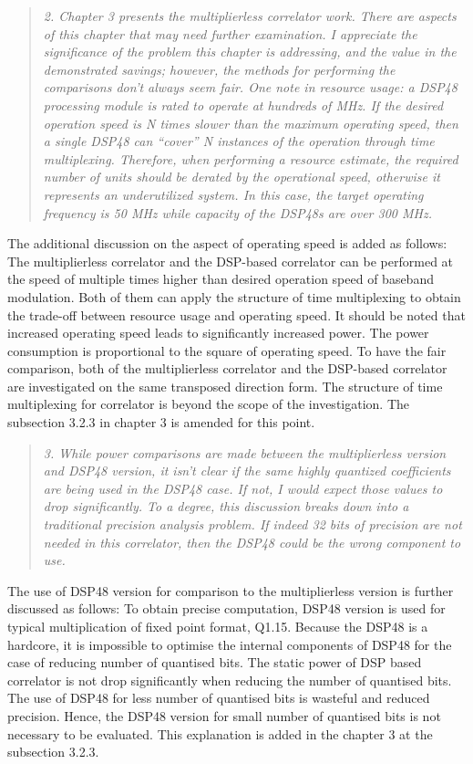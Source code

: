\documentclass{article}
\begin{document}
\begin{quote}
\emph{2. Chapter 3 presents the multiplierless correlator work. There are aspects of this chapter that may need further examination. I appreciate the significance of the problem this chapter is addressing, and the value in the demonstrated savings; however, the methods for performing the comparisons don’t always seem fair.
One note in resource usage: a DSP48 processing module is rated to operate at hundreds of MHz. If the desired operation speed is N times slower than the maximum operating speed, then a single DSP48 can “cover” N instances of the operation through time multiplexing. Therefore, when performing a resource estimate, the required number of units should be derated by the operational speed, otherwise it represents an underutilized system. In this case, the target operating frequency is 50 MHz while capacity of the DSP48s are over 300 MHz.	}
\end{quote}
The additional discussion on the aspect of operating speed is added as follows:  
The multiplierless correlator and the DSP-based correlator can be performed at the speed of multiple times higher than desired operation speed of baseband modulation. Both of them can apply the structure of time multiplexing to obtain the trade-off between resource usage and operating speed. It should be noted that increased operating speed leads to significantly increased power. The power consumption is proportional to the square of operating speed. To have the fair comparison, both of the multiplierless correlator and the DSP-based correlator are investigated on the same transposed direction form. The structure of time multiplexing for correlator is beyond the scope of the investigation.
The subsection 3.2.3 in chapter 3 is amended for this point.

\begin{quote}
\emph{3. While power comparisons are made between the multiplierless version and DSP48 version, it isn’t clear if the same highly quantized coefficients are being used in the DSP48 case. If not, I would expect those values to drop significantly. To a degree, this discussion breaks down into a traditional precision analysis problem. If indeed 32 bits of precision are not needed in this correlator, then the DSP48 could be the wrong component to use.}
\end{quote}
The use of DSP48 version for comparison to the multiplierless version is further discussed as follows:
To obtain precise computation, DSP48 version is used for typical multiplication of fixed point format, Q1.15. Because the DSP48 is a hardcore, it is impossible to optimise the internal components of DSP48 for the case of reducing number of quantised bits. The static power of DSP based correlator is not drop significantly when reducing the number of quantised bits. The use of DSP48 for less number of quantised bits is wasteful and reduced precision. Hence, the DSP48 version for small number of quantised bits is not necessary to be evaluated.  
This explanation is added in the chapter 3 at the subsection 3.2.3.
\end{document}
